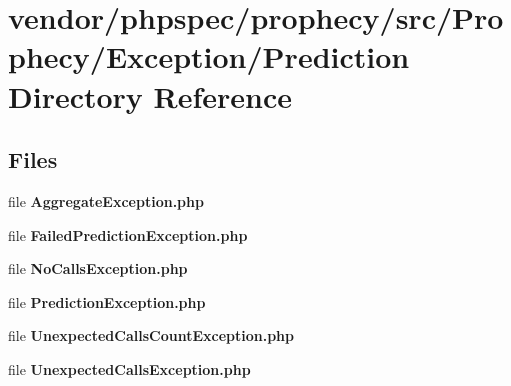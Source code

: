 \section{vendor/phpspec/prophecy/src/\+Prophecy/\+Exception/\+Prediction Directory Reference}
\label{dir_8c422e340844e96ab08a73c113d34d51}
\subsection*{Files}
\begin{DoxyCompactItemize}
\item 
file {\bf Aggregate\+Exception.\+php}
\item 
file {\bf Failed\+Prediction\+Exception.\+php}
\item 
file {\bf No\+Calls\+Exception.\+php}
\item 
file {\bf Prediction\+Exception.\+php}
\item 
file {\bf Unexpected\+Calls\+Count\+Exception.\+php}
\item 
file {\bf Unexpected\+Calls\+Exception.\+php}
\end{DoxyCompactItemize}
